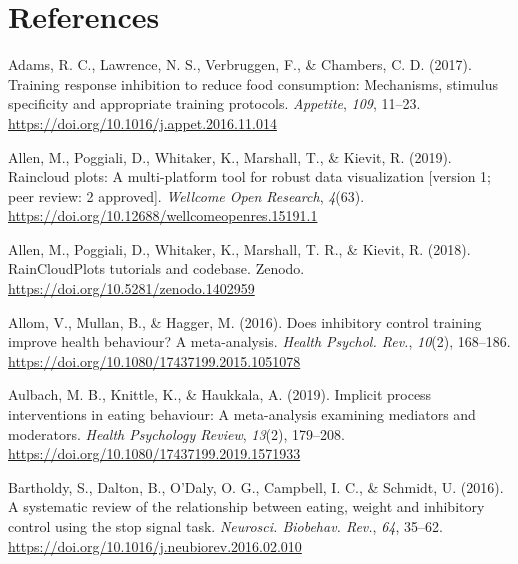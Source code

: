 \documentclass[man,floatsintext]{apa6}
\begin{document}
\newpage



\hypertarget{references}{%
\section{References}\label{references}}

\begingroup
\setlength{\parindent}{-0.5in}
\setlength{\leftskip}{0.5in}

\hypertarget{refs}{}
\leavevmode\hypertarget{ref-adams_training_2017}{}%
Adams, R. C., Lawrence, N. S., Verbruggen, F., \& Chambers, C. D. (2017). Training response inhibition to reduce food consumption: Mechanisms, stimulus specificity and appropriate training protocols. \emph{Appetite}, \emph{109}, 11--23. \url{https://doi.org/10.1016/j.appet.2016.11.014}

\leavevmode\hypertarget{ref-10.12688ux2fwellcomeopenres.15191.1}{}%
Allen, M., Poggiali, D., Whitaker, K., Marshall, T., \& Kievit, R. (2019). Raincloud plots: A multi-platform tool for robust data visualization {[}version 1; peer review: 2 approved{]}. \emph{Wellcome Open Research}, \emph{4}(63). \url{https://doi.org/10.12688/wellcomeopenres.15191.1}

\leavevmode\hypertarget{ref-micah_allen_raincloudplots_2018}{}%
Allen, M., Poggiali, D., Whitaker, K., Marshall, T. R., \& Kievit, R. (2018). RainCloudPlots tutorials and codebase. Zenodo. \url{https://doi.org/10.5281/zenodo.1402959}

\leavevmode\hypertarget{ref-allom_does_2016}{}%
Allom, V., Mullan, B., \& Hagger, M. (2016). Does inhibitory control training improve health behaviour? A meta-analysis. \emph{Health Psychol. Rev.}, \emph{10}(2), 168--186. \url{https://doi.org/10.1080/17437199.2015.1051078}

\leavevmode\hypertarget{ref-aulbach_implicit_2019}{}%
Aulbach, M. B., Knittle, K., \& Haukkala, A. (2019). Implicit process interventions in eating behaviour: A meta-analysis examining mediators and moderators. \emph{Health Psychology Review}, \emph{13}(2), 179--208. \url{https://doi.org/10.1080/17437199.2019.1571933}

\leavevmode\hypertarget{ref-bartholdy_systematic_2016}{}%
Bartholdy, S., Dalton, B., O'Daly, O. G., Campbell, I. C., \& Schmidt, U. (2016). A systematic review of the relationship between eating, weight and inhibitory control using the stop signal task. \emph{Neurosci. Biobehav. Rev.}, \emph{64}, 35--62. \url{https://doi.org/10.1016/j.neubiorev.2016.02.010}
\end{document}
